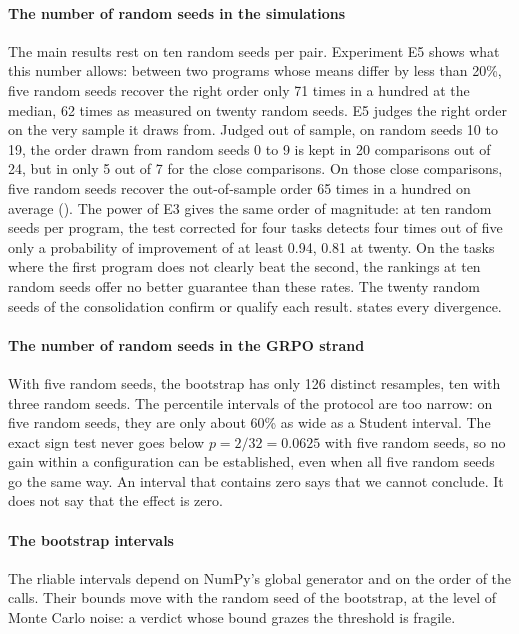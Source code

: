 \paragraph{The number of random seeds in the simulations} The main results rest on ten random seeds
per pair. Experiment E5 shows what this number allows: between two programs whose means differ by
less than 20\%, five random seeds recover the right order only 71 times in a hundred at the median,
62 times as measured on twenty random seeds. E5 judges the right order on the very sample it draws
from. Judged out of sample, on random seeds 10 to 19, the order drawn from random seeds 0 to 9 is
kept in 20 comparisons out of 24, but in only 5 out of 7 for the close comparisons. On those close
comparisons, five random seeds recover the out-of-sample order 65 times in a hundred on average
(). The power of E3 gives the same order of
magnitude: at ten random seeds per program, the test corrected for four tasks detects four times out
of five only a probability of improvement of at least 0.94, 0.81 at twenty. On the
tasks where the first program does not clearly beat the second, the rankings at ten random seeds
offer no better guarantee than these rates. The twenty random seeds of the consolidation confirm or qualify each result.
 states every divergence.

\paragraph{The number of random seeds in the GRPO strand} With five random seeds, the bootstrap has
only 126 distinct resamples, ten with three random seeds. The percentile intervals of the protocol
are too narrow: on five random seeds, they are only about 60\% as wide as a Student interval. The
exact sign test never goes below $p = 2/32 = 0.0625$ with five random seeds, so no gain within a
configuration can be established, even when all five random seeds go the same way. An interval that contains zero says that we cannot conclude. It does not say that
the effect is zero.

\paragraph{The bootstrap intervals} The rliable intervals depend on NumPy's global generator and on
the order of the calls. Their bounds move with the random seed of the bootstrap, at the level of Monte
Carlo noise: a verdict whose bound grazes the threshold is fragile.

